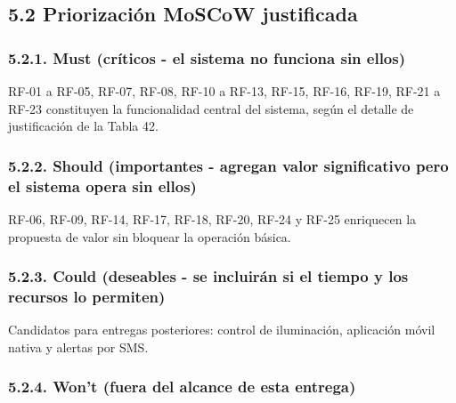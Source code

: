 \subsection*{5.2 Priorización MoSCoW justificada}


\subsubsection*{5.2.1. Must (críticos - el sistema no funciona sin ellos)}


RF-01 a RF-05, RF-07, RF-08, RF-10 a RF-13, RF-15, RF-16, RF-19, RF-21 a RF-23 constituyen la funcionalidad central del sistema, según el detalle de justificación de la Tabla 42.


\subsubsection*{5.2.2. Should (importantes - agregan valor significativo pero el sistema opera sin ellos)}


RF-06, RF-09, RF-14, RF-17, RF-18, RF-20, RF-24 y RF-25 enriquecen la propuesta de valor sin bloquear la operación básica.


\subsubsection*{5.2.3. Could (deseables - se incluirán si el tiempo y los recursos lo permiten)}


Candidatos para entregas posteriores: control de iluminación, aplicación móvil nativa y alertas por SMS.


\subsubsection*{5.2.4. Won't (fuera del alcance de esta entrega)}


